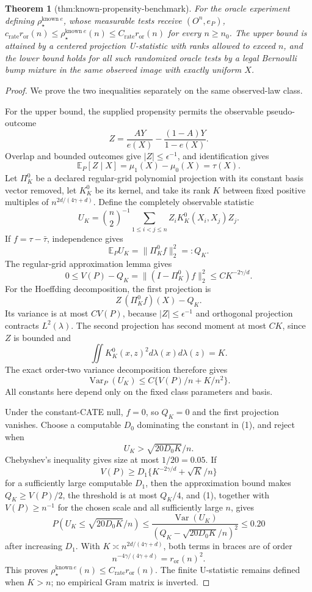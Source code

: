 \documentclass{article}
\newtheorem{theorem}{Theorem}
\begin{document}
\begin{theorem}[thm:known-propensity-benchmark]\label{thm:known-propensity-benchmark}
For the oracle experiment defining \(\rho_\star^{\mathrm{known}\ e}\), whose measurable tests receive \((O^n,e_P)\), \(c_{\mathrm{rate}}r_{\mathrm{or}}(n)\le\rho_\star^{\mathrm{known}\ e}(n)\le C_{\mathrm{rate}}r_{\mathrm{or}}(n)\) for every \(n\ge n_0\). The upper bound is attained by a centered projection U-statistic with ranks allowed to exceed \(n\), and the lower bound holds for all such randomized oracle tests by a legal Bernoulli bump mixture in the same observed image with exactly uniform \(X\).
\end{theorem}
\begin{proof}
We prove the two inequalities separately on the same observed-law class.

For the upper bound, the supplied propensity permits the observable pseudo-outcome
\[
 Z=\frac{AY}{e(X)}-\frac{(1-A)Y}{1-e(X)}.
\]
Overlap and bounded outcomes give \(|Z|\le\epsilon^{-1}\), and identification gives
\[
 \mathbb E_P[Z\mid X]
 =\mu_1(X)-\mu_0(X)=\tau(X).
\]
Let \(\Pi_K^0\) be a declared regular-grid polynomial projection with its constant basis vector removed, let \(K_K^0\) be its kernel, and take its rank \(K\) between fixed positive multiples of \(n^{2d/(4\gamma+d)}\).  Define the completely observable statistic
\[
 U_K=\binom n2^{-1}\sum_{1\le i<j\le n}
 Z_iK_K^0(X_i,X_j)Z_j.
\]
If \(f=\tau-\bar\tau\), independence gives
\[
 \mathbb E_PU_K=\|\Pi_K^0f\|_2^2=:Q_K.
\]
The regular-grid approximation lemma gives
\[
 0\le V(P)-Q_K=\|(I-\Pi_K^0)f\|_2^2
 \le C K^{-2\gamma/d}.
\]
For the Hoeffding decomposition, the first projection is
\[
 Z\,(\Pi_K^0f)(X)-Q_K.
\]
Its variance is at most \(C V(P)\), because \(|Z|\le\epsilon^{-1}\) and orthogonal projection contracts \(L^2(\lambda)\).  The second projection has second moment at most \(CK\), since \(Z\) is bounded and
\[
 \iint K_K^0(x,z)^2d\lambda(x)d\lambda(z)=K.
\]
The exact order-two variance decomposition therefore gives
\[
 \operatorname{Var}_P(U_K)\le C\{V(P)/n+K/n^2\}. \tag{1}
\]
All constants here depend only on the fixed class parameters and basis.

Under the constant-CATE null, \(f=0\), so \(Q_K=0\) and the first projection vanishes.  Choose a computable \(D_0\) dominating the constant in (1), and reject when
\[
 U_K>\sqrt{20D_0K}/n.
\]
Chebyshev's inequality gives size at most \(1/20=0.05\).  If
\[
 V(P)\ge D_1\{K^{-2\gamma/d}+\sqrt K/n\}
\]
for a sufficiently large computable \(D_1\), then the approximation bound makes \(Q_K\ge V(P)/2\), the threshold is at most \(Q_K/4\), and (1), together with \(V(P)\ge n^{-1}\) for the chosen scale and all sufficiently large \(n\), gives
\[
 P(U_K\le\sqrt{20D_0K}/n)
 \le \frac{\operatorname{Var}(U_K)}{(Q_K-\sqrt{20D_0K}/n)^2}
 \le0.20
\]
after increasing \(D_1\).  With \(K\asymp n^{2d/(4\gamma+d)}\), both terms in braces are of order
\[
 n^{-4\gamma/(4\gamma+d)}=r_{\mathrm{or}}(n)^2.
\]
This proves \(\rho_\star^{\mathrm{known}\ e}(n)\le C_{\mathrm{rate}}r_{\mathrm{or}}(n)\).  The finite U-statistic remains defined when \(K>n\); no empirical Gram matrix is inverted.


\end{proof}
\end{document}
